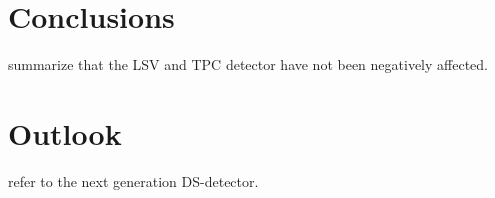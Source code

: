\section{Conclusions}\label{sec:Conclusions}
summarize that the LSV and TPC detector have not been negatively affected.
\section{Outlook}\label{sec:Outlook}
refer to the next generation DS-detector.
